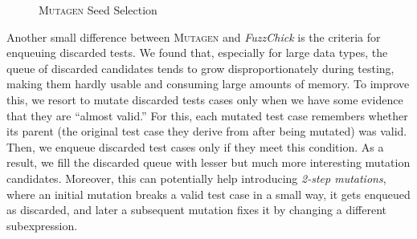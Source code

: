 \documentclass[acmsmall, anonymous]{acmart}
\newcommand{\fuzzchick}{\textit{FuzzChick}\xspace}
\newcommand{\mutagen}{\textsc{Mutagen}\xspace}
\begin{document}
\begin{figure}[b]
\begin{multicols}{2}

\begin{algorithm}[H]
  \SetInd{0em}{0.75em}
  \SetAlgoLined
  \DontPrintSemicolon
\caption{\label{algo:mutagen:loop}\mutagen Testing Loop}
\end{algorithm}

\columnbreak

\begin{algorithm}[H]
  \SetInd{0em}{0.75em}
  \SetAlgoLined
  \DontPrintSemicolon
\caption{\label{algo:mutagen:pick}\mutagen Seed Selection}
\vspace{1pt}
\end{algorithm}
\end{multicols}
\end{figure}

Another small difference between \mutagen and \fuzzchick is the criteria for
enqueuing discarded tests.
%
We found that, especially for large data types, the queue of discarded
candidates tends to grow disproportionately during testing, making them hardly
usable and consuming large amounts of memory.
%
To improve this, we resort to mutate discarded tests cases only when we have
some evidence that they are ``almost valid.''
%
For this, each mutated test case remembers whether its parent (the original test
case they derive from after being mutated) was valid.
%
Then, we enqueue discarded test cases only if they meet this condition.
%
As a result, we fill the discarded queue with lesser but much more interesting
mutation candidates.
%
Moreover, this can potentially help introducing \emph{2-step mutations}, where
an initial mutation breaks a valid test case in a small way, it gets enqueued as
discarded, and later a subsequent mutation fixes it by changing a different
subexpression.
\end{document}

